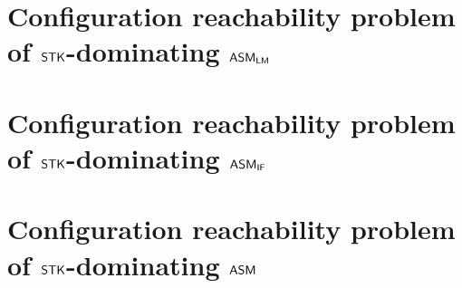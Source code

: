 


\section{Configuration reachability problem of $\mathsf{STK}$-dominating $\textsf{ASM}_\textsf{LM}$}\label{sec:reach-lmamass}


\section{Configuration reachability problem of $\mathsf{STK}$-dominating $\textsf{ASM}_\textsf{IF}$}\label{sec:reach-ifamass}



\section{Configuration reachability problem of $\mathsf{STK}$-dominating $\textsf{ASM}$}\label{sec:reach-amass}
